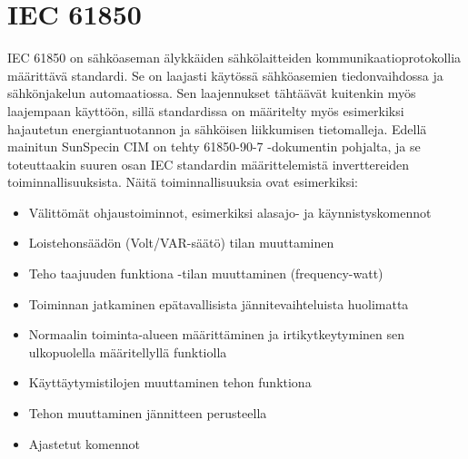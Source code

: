 \section{IEC 61850}
  IEC 61850 on sähköaseman älykkäiden sähkölaitteiden kommunikaatioprotokollia määrittävä standardi. Se on laajasti käytössä sähköasemien tiedonvaihdossa ja sähkönjakelun automaatiossa. Sen laajennukset tähtäävät kuitenkin myös laajempaan käyttöön, sillä standardissa on määritelty myös esimerkiksi hajautetun energiantuotannon ja sähköisen liikkumisen tietomalleja. Edellä mainitun SunSpecin CIM on tehty 61850-90-7 -dokumentin pohjalta, ja se toteuttaakin suuren osan IEC standardin määrittelemistä inverttereiden toiminnallisuuksista. Näitä toiminnallisuuksia ovat esimerkiksi:
  \begin{itemize}
    \item Välittömät ohjaustoiminnot, esimerkiksi alasajo- ja käynnistyskomennot
    \item Loistehonsäädön (Volt/VAR-säätö) tilan muuttaminen
    \item Teho taajuuden funktiona -tilan muuttaminen (frequency-watt)
    \item Toiminnan jatkaminen epätavallisista jännitevaihteluista huolimatta
    \item Normaalin toiminta-alueen määrittäminen ja irtikytkeytyminen sen ulkopuolella määritellyllä funktiolla
    \item Käyttäytymistilojen muuttaminen tehon funktiona
    \item Tehon muuttaminen jännitteen perusteella
    \item Ajastetut komennot
  \end{itemize}

